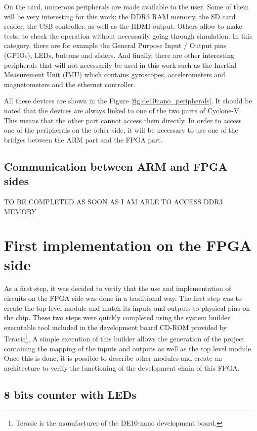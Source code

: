 \documentclass[12pt]{article}
\begin{document}
On the card, numerous peripherals are made available to the user. Some of them will be very interesting for this work: the DDR3 RAM memory, the SD card reader, the USB controller, as well as the HDMI output. Others allow to make tests, to check the operation without necessarily going through simulation. In this category, there are for example the General Purpose Input / Output pins (GPIOs), LEDs, buttons and sliders. And finally, there are other interesting peripherals that will not necessarily be used in this work such as the Inertial Measurement Unit (IMU) which contains gyroscopes, accelerometers and magnetometers and the ethernet controller.

\vspace{12pt}
All these devices are shown in the Figure \ref{fig:de10nano_peripherals}. It should be noted that the devices are always linked to one of the two parts of Cyclone-V. This means that the other part cannot access them directly. In order to access one of the peripherals on the other side, it will be necessary to use one of the bridges between the ARM part and the FPGA
part.

\subsection{Communication between ARM and FPGA sides}

TO BE COMPLETED AS SOON AS I AM ABLE TO ACCESS DDR3 MEMORY

\section{First implementation on the FPGA side}

As a first step, it was decided to verify that the use and implementation of circuits on the FPGA side was done in a traditional way. The first step was to create the top-level module and match its inputs and outputs to physical pins on the chip. These two steps were quickly completed using the system builder executable tool included in the development board CD-ROM provided by Terasic\footnote{Terasic is the manufacturer of the DE10-nano development board.}. A simple execution of this builder allows the generation of the project containing the mapping of the inputs and outputs as well as the top level module. Once this is done, it is possible to describe other modules and create an architecture to verify the functioning of the development chain of this FPGA.

\subsection{8 bits counter with LEDs}
\end{document}

